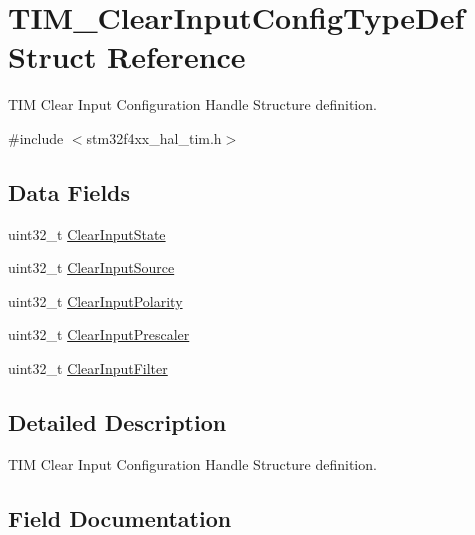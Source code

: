 \hypertarget{struct_t_i_m___clear_input_config_type_def}{}\section{T\+I\+M\+\_\+\+Clear\+Input\+Config\+Type\+Def Struct Reference}
\label{struct_t_i_m___clear_input_config_type_def}


T\+IM Clear Input Configuration Handle Structure definition.  




{\ttfamily \#include $<$stm32f4xx\+\_\+hal\+\_\+tim.\+h$>$}

\subsection*{Data Fields}
\begin{DoxyCompactItemize}
\item 
uint32\+\_\+t \hyperlink{struct_t_i_m___clear_input_config_type_def_a01d4b91dd297c4f0582a4d9179abf32f}{Clear\+Input\+State}
\item 
uint32\+\_\+t \hyperlink{struct_t_i_m___clear_input_config_type_def_a776d2f14021a82e022468fd46594b8a0}{Clear\+Input\+Source}
\item 
uint32\+\_\+t \hyperlink{struct_t_i_m___clear_input_config_type_def_a49dbc65edc5316822fcabd61cc8409de}{Clear\+Input\+Polarity}
\item 
uint32\+\_\+t \hyperlink{struct_t_i_m___clear_input_config_type_def_a509cecb64fec71391ddc8b4703e09cfe}{Clear\+Input\+Prescaler}
\item 
uint32\+\_\+t \hyperlink{struct_t_i_m___clear_input_config_type_def_a6d2e06a970e30aaf4f8a6091e443eecf}{Clear\+Input\+Filter}
\end{DoxyCompactItemize}


\subsection{Detailed Description}
T\+IM Clear Input Configuration Handle Structure definition. 

\subsection{Field Documentation}
\mbox{\label{struct_t_i_m___clear_input_config_type_def_a6d2e06a970e30aaf4f8a6091e443eecf}} 
